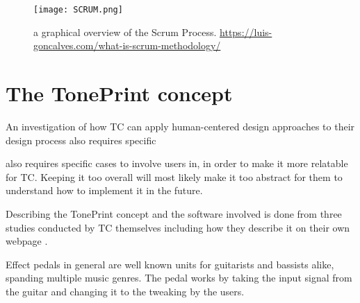 \begin{figure}[H]
	\centering
	\texttt{[image: SCRUM.png]}
	\caption{a graphical overview of the Scrum Process. \url{https://luis-goncalves.com/what-is-scrum-methodology/}}
	\label{fig:ScrumExplanation}
\end{figure}


\section{The TonePrint concept}
\label{TonePrintConceptDefined}
An investigation of how TC can apply human-centered design approaches to their design process also requires specific 

also requires specific cases to involve users in, in order to make it more relatable for TC. Keeping it too overall will most likely make it too abstract for them to understand how to implement it in the future.  

Describing the TonePrint concept and the software involved is done from three studies conducted by TC themselves \parencite{PDF:TonePrintAnalyse, PDF:DesignforloebAfUserTonePrint, PDF:BrugerWorkshopUserTonePrints} including how they describe it on their own webpage \parencite{WEB:AboutTonePrints}. 


Effect pedals in general are well known units for guitarists and bassists alike, spanding multiple music genres. The pedal works by taking the input signal from the guitar and changing it to the tweaking by the users.


